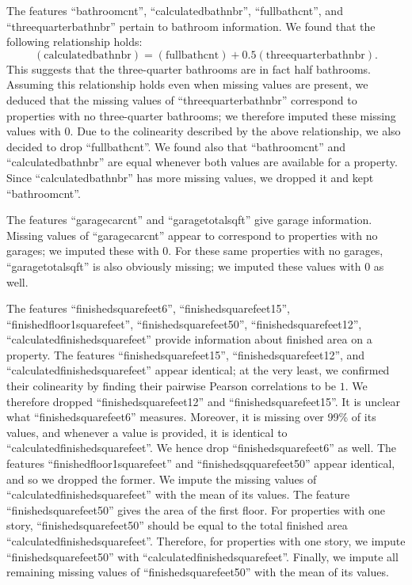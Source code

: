 \documentclass[12pt]{article}
\begin{document}
The features ``bathroomcnt'', ``calculatedbathnbr'', ``fullbathcnt'', and ``threequarterbathnbr'' pertain to bathroom information. We found that the following relationship holds:
\[ (\mbox{calculatedbathnbr}) = (\mbox{fullbathcnt}) + 0.5(\mbox{threequarterbathnbr}). \]
This suggests that the three-quarter bathrooms are in fact half bathrooms. Assuming this relationship holds even when missing values are present, we deduced that the missing values of ``threequarterbathnbr'' correspond to properties with no three-quarter bathrooms; we therefore imputed these missing values with $0$. Due to the colinearity described by the above relationship, we also decided to drop ``fullbathcnt''. We found also that ``bathroomcnt'' and ``calculatedbathnbr'' are equal whenever both values are available for a property. Since ``calculatedbathnbr'' has more missing values, we dropped it and kept ``bathroomcnt''.

The features ``garagecarcnt'' and ``garagetotalsqft'' give garage information. Missing values of ``garagecarcnt'' appear to correspond to properties with no garages; we imputed these with $0$. For these same properties with no garages, ``garagetotalsqft'' is also obviously missing; we imputed these values with $0$ as well.

The features ``finishedsquarefeet6'', ``finishedsquarefeet15'', ``finishedfloor1squarefeet'', ``finishedsquarefeet50'', ``finishedsquarefeet12'', ``calculatedfinishedsquarefeet'' provide information about finished area on a property. The features ``finishedsquarefeet15'', ``finishedsquarefeet12'', and ``calculatedfinishedsquarefeet'' appear identical; at the very least, we confirmed their colinearity by finding their pairwise Pearson correlations to be $1$. We therefore dropped ``finishedsquarefeet12'' and ``finishedsquarefeet15''. It is unclear what ``finishedsquarefeet6'' measures. Moreover, it is missing over 99\% of its values, and whenever a value is provided, it is identical to ``calculatedfinishedsquarefeet''. We hence drop ``finishedsquarefeet6'' as well. The features ``finishedfloor1squarefeet'' and ``finishedsqquarefeet50'' appear identical, and so we dropped the former. We impute the missing values of ``calculatedfinishedsquarefeet'' with the mean of its values. The feature ``finishedsquarefeet50'' gives the area of the first floor. For properties with one story, ``finishedsquarefeet50'' should be equal to the total finished area ``calculatedfinishedsquarefeet''. Therefore, for properties with one story, we impute ``finishedsquarefeet50'' with ``calculatedfinishedsquarefeet''. Finally, we impute all remaining missing values of ``finishedsquarefeet50'' with the mean of its values.
\end{document}
